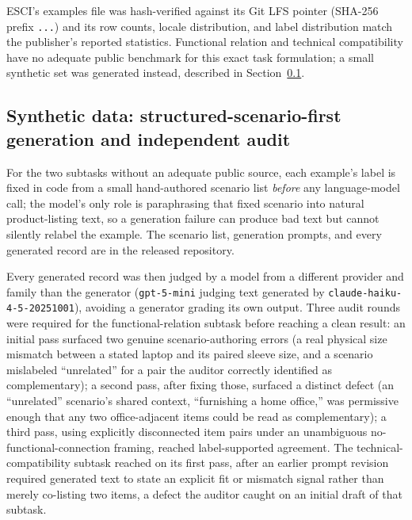 \documentclass{article}
\newcommand{\code}[1]{\texttt{#1}}
\begin{document}
ESCI's examples file was hash-verified against its Git LFS pointer (SHA-256 prefix \code{\EsciExamplesShaPrefix{}...}) and its row counts, locale distribution, and label distribution match the publisher's reported statistics. Functional relation and technical compatibility have no adequate public benchmark for this exact task formulation; a small synthetic set was generated instead, described in Section~\ref{sec:synthetic}.

\subsection{Synthetic data: structured-scenario-first generation and independent audit}
\label{sec:synthetic}
For the two subtasks without an adequate public source, each example's label is fixed in code from a small hand-authored scenario list \emph{before} any language-model call; the model's only role is paraphrasing that fixed scenario into natural product-listing text, so a generation failure can produce bad text but cannot silently relabel the example. The scenario list, generation prompts, and every generated record are in the released repository.

Every generated record was then judged by a model from a different provider and family than the generator (\code{gpt-5-mini} judging text generated by \code{claude-haiku-4-5-20251001}), avoiding a generator grading its own output. Three audit rounds were required for the functional-relation subtask before reaching a clean result: an initial pass surfaced two genuine scenario-authoring errors (a real physical size mismatch between a stated laptop and its paired sleeve size, and a scenario mislabeled ``unrelated'' for a pair the auditor correctly identified as complementary); a second pass, after fixing those, surfaced a distinct defect (an ``unrelated'' scenario's shared context, ``furnishing a home office,'' was permissive enough that any two office-adjacent items could be read as complementary); a third pass, using explicitly disconnected item pairs under an unambiguous no-functional-connection framing, reached \SyntheticFunctionalAuditRate{} label-supported agreement. The technical-compatibility subtask reached \SyntheticCompatAuditRate{} on its first pass, after an earlier prompt revision required generated text to state an explicit fit or mismatch signal rather than merely co-listing two items, a defect the auditor caught on an initial draft of that subtask.
\end{document}
